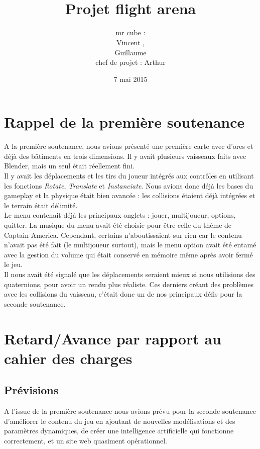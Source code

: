 \documentclass[10pt, titlepage]{report}
\title{\bsc{Rapport de la deuxième soutenance}\\Projet flight arena}
\author{mr cube :\\
Vincent \bsc{Rospini-Clerici},\\
Guillaume \bsc{Rebut}\\
chef de projet : Arthur \bsc{Remaud}}
\date{7 mai 2015}
\begin{document}
\maketitle
\renewcommand{\contentsname}{Sommaire}
\renewcommand{\chaptername}{Partie}

\tableofcontents

\chapter{Rappel de la première soutenance}
A la première soutenance, nous avions présenté une première carte avec d’ores et déjà des bâtiments en trois dimensions. Il y avait plusieurs vaisseaux faits avec Blender, mais un seul était réellement fini.\\

Il y avait les déplacements et les tirs du joueur intégrés aux contrôles en utilisant les fonctions \textit{Rotate}, \textit{Translate} et \textit{Instanciate}. Nous avions donc déjà les bases du gameplay et la physique était bien avancée : les collisions étaient déjà intégrées et le terrain était délimité.\\

Le menu contenait déjà les principaux onglets : jouer, multijoueur, options, quitter. La musique du menu avait été choisie pour être celle du thème de Captain America. Cependant, certains n'aboutissaient sur rien car le contenu n'avait pas été fait (le multijoueur surtout), mais le menu option avait été entamé avec la gestion du volume qui était conservé en mémoire même après avoir fermé le jeu.\\

Il nous avait été signalé que les déplacements seraient mieux si nous utilisions des quaternions, pour avoir un rendu plus réaliste. Ces derniers créant des problèmes avec les collisions du vaisseau, c’était donc un de nos principaux défis pour la seconde soutenance.\\


\chapter{Retard/Avance par rapport au cahier des charges}

\section{Prévisions}
A l'issue de la première soutenance nous avions prévu pour la seconde soutenance d'améliorer le contenu du jeu en ajoutant de nouvelles modélisations et des paramètres dynamiques, de créer une intelligence artificielle qui fonctionne correctement, et un site web quasiment opérationnel.\\
\end{document}
